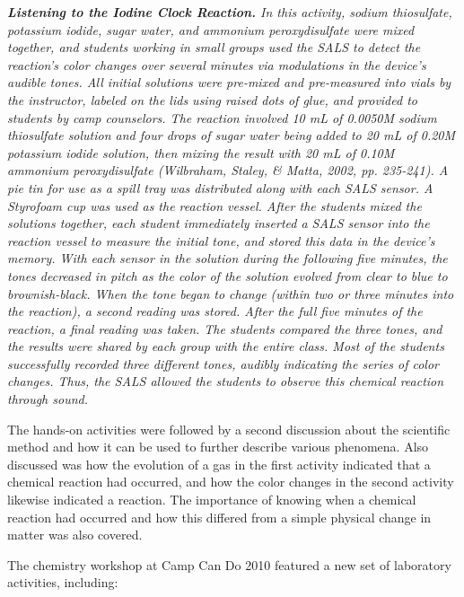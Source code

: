 \documentclass[11.5pt]{sig-alternate} %
\begin{document}
\begin{large}
\textit{\textbf{Listening to the Iodine Clock Reaction.} In this activity, sodium thiosulfate, potassium iodide, sugar water, and ammonium peroxydisulfate were mixed together, and students working in small groups used the SALS to detect the reaction’s color changes over several minutes via modulations in the device’s audible tones. All initial solutions were pre-mixed and pre-measured into vials by the instructor, labeled on the lids using raised dots of glue, and provided to students by camp counselors. The reaction involved 10 mL of 0.0050M sodium thiosulfate solution and four drops of sugar water being added to 20 mL of 0.20M potassium iodide solution, then mixing the result with 20 mL of 0.10M ammonium peroxydisulfate (Wilbraham, Staley, \& Matta, 2002, pp. 235-241). A pie tin for use as a spill tray was distributed along with each SALS sensor. A Styrofoam cup was used as the reaction vessel. After the students mixed the solutions together, each student immediately inserted a SALS sensor into the reaction vessel to measure the initial tone, and stored this data in the device’s memory. With each sensor in the solution during the following five minutes, the tones decreased in pitch as the color of the solution evolved from clear to blue to brownish-black. When the tone began to change (within two or three minutes into the reaction), a second reading was stored. After the full five minutes of the reaction, a final reading was taken. The students compared the three tones, and the results were shared by each group with the entire class. Most of the students successfully recorded three different tones, audibly indicating the series of color changes. Thus, the SALS allowed the students to observe this chemical reaction through sound.}

The hands-on activities were followed by a second discussion about the scientific method and how it can be used to further describe various phenomena. Also discussed was how the evolution of a gas in the first activity indicated that a chemical reaction had occurred, and how the color changes in the second activity likewise indicated a reaction. The importance of knowing when a chemical reaction had occurred and how this differed from a simple physical change in matter was also covered.

The chemistry workshop at Camp Can Do 2010 featured a new set of laboratory activities, including:


\end{large}
\end{document}
